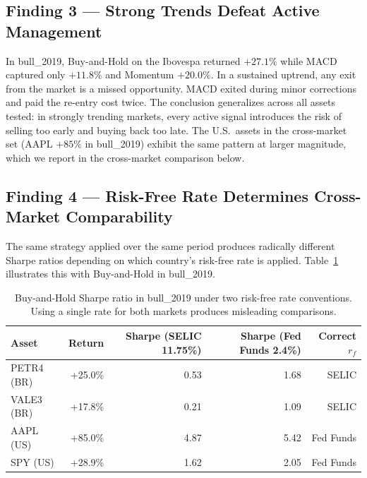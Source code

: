 \documentclass{article}
\begin{document}
\subsection{Finding 3 --- Strong Trends Defeat Active Management}

In bull\_2019, Buy-and-Hold on the Ibovespa returned $+27.1\%$ while
MACD captured only $+11.8\%$ and Momentum $+20.0\%$. In a sustained
uptrend, any exit from the market is a missed opportunity. MACD exited
during minor corrections and paid the re-entry cost twice. The
conclusion generalizes across all assets tested: in strongly trending
markets, every active signal introduces the risk of selling too early
and buying back too late. The U.S.\ assets in the cross-market set
(AAPL $+85\%$ in bull\_2019) exhibit the same pattern at larger
magnitude, which we report in the cross-market comparison below.

\subsection{Finding 4 --- Risk-Free Rate Determines Cross-Market Comparability}

The same strategy applied over the same period produces radically
different Sharpe ratios depending on which country's risk-free rate is
applied. Table~\ref{tab:cross_market} illustrates this with Buy-and-Hold
in bull\_2019.

\begin{table}[h]
\centering
\caption{Buy-and-Hold Sharpe ratio in bull\_2019 under two risk-free
  rate conventions. Using a single rate for both markets produces
  misleading comparisons.}
\label{tab:cross_market}
\begin{tabular}{lrrrr}
\toprule
\textbf{Asset} & \textbf{Return} & \textbf{Sharpe (SELIC 11.75\%)}
  & \textbf{Sharpe (Fed Funds 2.4\%)} & \textbf{Correct $r_f$} \\
\midrule
PETR4 (BR) & +25.0\% & 0.53 & 1.68 & SELIC \\
VALE3 (BR) & +17.8\% & 0.21 & 1.09 & SELIC \\
AAPL  (US) & +85.0\% & 4.87 & 5.42 & Fed Funds \\
SPY   (US) & +28.9\% & 1.62 & 2.05 & Fed Funds \\
\bottomrule
\end{tabular}
\end{table}
\end{document}
